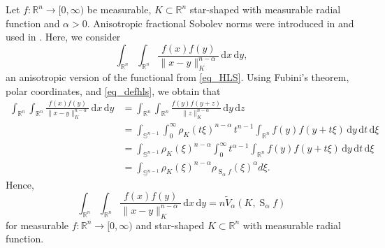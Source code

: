 \documentclass{amsart}
\newcommand{\R}{\mathbb R}
\newcommand{\sn}{{\mathbb S}^{n-1}}
\renewcommand{\d}{\,\mathrm{d}}
\newcommand{\hls}[1]{\operatorname{S}_{#1}\!} %
\begin{document}
Let $f: \R^n\to [0,\infty)$ be measurable, $K\subset \R^n$  star-shaped with measurable radial function and $\alpha>0$.
Anisotropic fractional Sobolev norms were introduced in \cite{Ludwig:fracperi, Ludwig:fracnorm} and used in \cite{HaddadLudwig_fracsob}. Here, we consider 
\[\int_{\R^n}\int_{\R^n} \frac{f(x) f(y)}{\|x-y\|_K^{n-\alpha}}\d x\d y,\]
an anisotropic version of the functional from \eqref{eq_HLS}.
Using Fubini's theorem, polar coordinates, and \eqref{eq_defhls}, we obtain that
\begin{align*}
	\int_{\R^n}\int_{\R^n} \frac{f(x) f(y)}{\|x-y\|_K^{n-\alpha}}\d x\d y
	&= \int_{\R^n}\int_{\R^n} \frac{ f(y) f(y+z)}{\|z\|_K^{n-\alpha}} \d y \d z \\
	&= \int_{\sn} \int_0^\infty \rho_K(t \xi )^{n-\alpha}\,  t^{n-1} \int_{\R^n} f(y) f(y+t \xi)  \d y \d t \d\xi \\
	&= \int_{\sn} \rho_K(\xi )^{n-\alpha} \int_0^\infty t^{\alpha-1} \int_{\R^n} f(y) f(y+t \xi) \d y \d t \d\xi \\
	&= \int_{\sn} \rho_K(\xi )^{n-\alpha} \rho_{\hls\alpha f}(\xi)^\alpha d\xi.
\end{align*}
Hence,
\begin{equation}\label{eq_new_def_c}
\int_{\R^n}\int_{\R^n} \frac{f(x) f(y)}{\|x-y\|_K^{n-\alpha}}\d x\d y=n \tilde V_\alpha (K, \hls\alpha f)
\end{equation}
for measurable $f:\R^n\to [0,\infty)$ and star-shaped $K\subset\R^n$ with measurable radial function.
\end{document}
